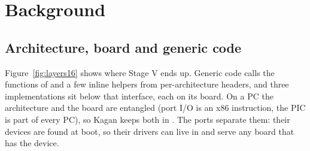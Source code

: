 \documentclass[11pt,a4paper]{article}
\begin{document}
\section{Background}

\subsection{Architecture, board and generic code}

Figure~\ref{fig:layers16} shows where Stage V ends up. Generic code calls the functions of  and a
few inline helpers from per-architecture headers, and three implementations sit below that interface, each on its
board. On a PC the architecture and the board are entangled (port I/O is an x86 instruction, the PIC is part of every
PC), so Kagan keeps both in . The ports separate them: their devices are found at boot, so
their drivers can live in  and serve any board that has the device.
\end{document}
